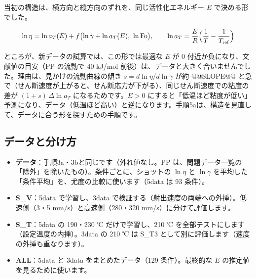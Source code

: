 \documentclass[paper=a4paper,fontsize=10.5pt,line_length=44zw,number_of_lines=38]{jlreq}
\newcommand{\gd}{\dot{\gamma}}
\newenvironment{points}{\begin{itemize}[label=$\triangleright$,leftmargin=1.5\zw,itemsep=0.3ex,topsep=0.5ex,parsep=0pt]}{\end{itemize}}
\newcommand{\pt}[1]{\item \textbf{#1}：}
\begin{document}
当初の構造は、横方向と縦方向のずれを、同じ活性化エネルギー $E$ で決める形でした。

\begin{equation}
\ln\eta = \ln a_T(E) + f\bigl(\ln\gd + \ln a_T(E),\ \ln \mathrm{Fo}\bigr),\qquad \ln a_T = \frac{E}{R}\Bigl(\frac1T - \frac1{T_{\mathrm{ref}}}\Bigr)
\end{equation}

ところが、新データの試算では、この形では最適な $E$ が 0 付近か負になり、文献値の目安（PP の流動で 40 kJ/mol 前後）は、データと大きく合いませんでした。理由は、見かけの流動曲線の傾き $s = d\ln\eta/d\ln\gd$ が約 @@SLOPE@@ と急で（せん断速度が上がると、せん断応力が下がる）、同じせん断速度での粘度の差が $(1+s)\,\Delta\ln a_T$ になるためです。$E>0$ にすると「低温ほど粘度が低い」予測になり、データ（低温ほど高い）と逆になります。手順5aは、構造を見直して、データに合う形を探すための手順です。

\subsection{データと分け方}
\begin{points}
\pt{データ}手順3a・3bと同じです（外れ値なし。PP は、問題データ一覧の「除外」を除いたもの）。条件ごとに、ショットの $\ln\eta$ と $\ln\gd$ を平均した「条件平均」を、尤度の比較に使います（5data は 93 条件）。
\pt{S\_V}5data で学習し、3data で検証する（射出速度の両端への外挿）。低速側（3・5 mm/s）と高速側（280・320 mm/s）に分けて評価します。
\pt{S\_T}5data の 190・230 ℃ だけで学習し、210 ℃ を全部テストにします（設定温度の内挿）。3data の 210 ℃ は S\_T3 として別に評価します（速度の外挿も重なります）。
\pt{ALL}5data と 3data をまとめたデータ（129 条件）。最終的な $E$ の推定値を見るために使います。
\end{points}
\end{document}
